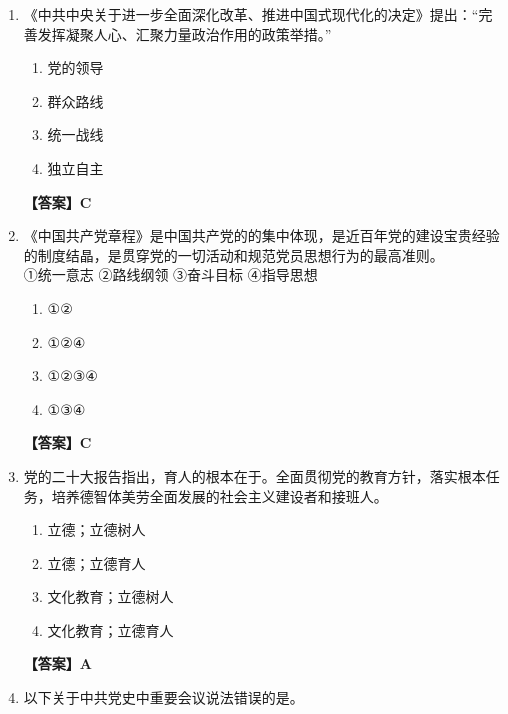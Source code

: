 \documentclass[UTF8,11pt,a4paper]{ctexart}
\begin{document}
\begin{enumerate}[label=\textbf{\arabic*.}, leftmargin=2.5em, itemsep=0.7em]
\begin{enumerate}[label=\Alph*., leftmargin=2em, itemsep=0.1em, topsep=0.15em]
\item 血脉金融监管
\item 根基金融机构公司治理
\item 血脉金融机构公司治理
\end{enumerate}
\textbf{【答案】B}
\item 《中共中央关于进一步全面深化改革、推进中国式现代化的决定》提出：“完善发挥\allowbreak\underline{\hspace{4em}}凝聚人心、汇聚力量政治作用的政策举措。”
\begin{enumerate}[label=\Alph*., leftmargin=2em, itemsep=0.1em, topsep=0.15em]
\item 党的领导
\item 群众路线
\item 统一战线
\item 独立自主
\end{enumerate}
\textbf{【答案】C}
\item 《中国共产党章程》是中国共产党的\allowbreak\underline{\hspace{4em}}的集中体现，是近百年党的建设宝贵经验的制度结晶，是贯穿党的一切活动和规范党员思想行为的最高准则。\\ ①统一意志 ②路线纲领 ③奋斗目标 ④指导思想
\begin{enumerate}[label=\Alph*., leftmargin=2em, itemsep=0.1em, topsep=0.15em]
\item ①②
\item ①②④
\item ①②③④
\item ①③④
\end{enumerate}
\textbf{【答案】C}
\item 党的二十大报告指出，育人的根本在于\allowbreak\underline{\hspace{4em}}。全面贯彻党的教育方针，落实\allowbreak\underline{\hspace{4em}}根本任务，培养德智体美劳全面发展的社会主义建设者和接班人。
\begin{enumerate}[label=\Alph*., leftmargin=2em, itemsep=0.1em, topsep=0.15em]
\item 立德；立德树人
\item 立德；立德育人
\item 文化教育；立德树人
\item 文化教育；立德育人
\end{enumerate}
\textbf{【答案】A}
\item 以下关于中共党史中重要会议说法错误的是\allowbreak\underline{\hspace{4em}}。
\begin{enumerate}[label=\Alph*., leftmargin=2em, itemsep=0.1em, topsep=0.15em]

\end{enumerate}
\end{enumerate}
\end{document}
